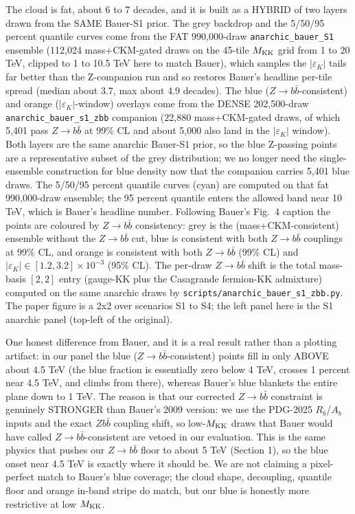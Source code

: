 \documentclass[11pt]{article}
\begin{document}
The cloud is fat, about 6 to 7 decades, and it is built as a HYBRID of two layers drawn from the
SAME Bauer-S1 prior. The grey backdrop and the 5/50/95 percent quantile curves come from the FAT
990{,}000-draw \texttt{anarchic\_bauer\_S1} ensemble (112{,}024 mass+CKM-gated draws on the 45-tile
$M_{\rm KK}$ grid from 1 to 20 TeV, clipped to 1 to 10.5 TeV here to match Bauer), which samples the
$|\varepsilon_K|$ tails far better than the Z-companion run and so restores Bauer's headline per-tile
spread (median about 3.7, max about 4.9 decades). The blue ($Z\to b\bar b$-consistent) and orange
($|\varepsilon_K|$-window) overlays come from the DENSE 202{,}500-draw \texttt{anarchic\_bauer\_s1\_zbb}
companion (22{,}880 mass+CKM-gated draws, of which 5{,}401 pass $Z\to b\bar b$ at 99\% CL and about
5{,}000 also land in the $|\varepsilon_K|$ window). Both layers are the same anarchic Bauer-S1 prior,
so the blue Z-passing points are a representative subset of the grey distribution; we no longer need
the single-ensemble construction for blue density now that the companion carries 5{,}401 blue draws.
The 5/50/95 percent quantile curves (cyan)
are computed on that fat 990{,}000-draw ensemble; the 95 percent quantile enters the allowed band near 10 TeV,
which is Bauer's headline number. Following Bauer's Fig.~4 caption the points are coloured by
$Z\to b\bar b$ consistency: grey is the (mass+CKM-consistent) ensemble without the $Z\to b\bar b$ cut,
blue is consistent with both $Z\to b\bar b$ couplings at 99\% CL, and orange is consistent with both
$Z\to b\bar b$ (99\% CL) and $|\varepsilon_K|\in[1.2,3.2]\times10^{-3}$ (95\% CL). The per-draw
$Z\to b\bar b$ shift is the total mass-basis $[2,2]$ entry (gauge-KK plus the Casagrande fermion-KK
admixture) computed on the same anarchic draws by \texttt{scripts/anarchic\_bauer\_s1\_zbb.py}. The
paper figure is a 2x2 over scenarios S1 to S4; the left panel here is the S1 anarchic panel (top-left
of the original).

One honest difference from Bauer, and it is a real result rather than a plotting artifact: in our
panel the blue ($Z\to b\bar b$-consistent) points fill in only ABOVE about 4.5 TeV (the blue fraction
is essentially zero below 4 TeV, crosses 1 percent near 4.5 TeV, and climbs from there), whereas
Bauer's blue blankets the entire plane down to 1 TeV. The reason is that our corrected $Z\to b\bar b$
constraint is genuinely STRONGER than Bauer's 2009 version: we use the PDG-2025 $R_b$/$A_b$ inputs and
the exact $Z b\bar b$ coupling shift, so low-$M_{\rm KK}$ draws that Bauer would have called $Z\to
b\bar b$-consistent are vetoed in our evaluation. This is the same physics that pushes our $Z\to
b\bar b$ floor to about 5 TeV (Section 1), so the blue onset near 4.5 TeV is exactly where it should
be. We are not claiming a pixel-perfect match to Bauer's blue coverage; the cloud shape, decoupling,
quantile floor and orange in-band stripe do match, but our blue is honestly more restrictive at low
$M_{\rm KK}$.
\end{document}
